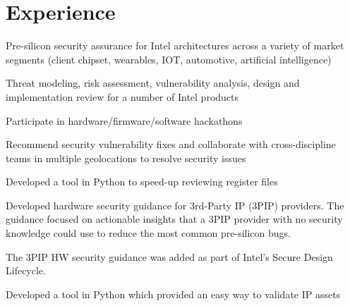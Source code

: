 \documentclass[]{detrano_resume}
\begin{document}
\hfill %
%
%
\begin{minipage}[t]{0.66\textwidth} 
	
	\section{Experience}
	\vspace{\topsep} %
	\begin{tightemize}
		\item Pre-silicon security assurance for Intel architectures across a variety of market segments (client chipset, wearables, IOT, automotive, artificial intelligence)
		\item Threat modeling, risk assessment, vulnerability analysis, design and implementation review for a number of Intel products 
		\item Participate in hardware/firmware/software hackathons 
		\item Recommend security vulnerability fixes and collaborate with cross-discipline teams in multiple geolocations to resolve security issues 
		\item Developed a tool in Python to speed-up reviewing register files 
	\end{tightemize}
	\sectionsep
	
	\begin{tightemize}
		\item Developed hardware security guidance for 3rd-Party IP (3PIP) providers.  The guidance focused on actionable insights that a 3PIP provider with no security knowledge could use to reduce the most common pre-silicon bugs.
		\item The 3PIP HW security guidance was added as part of Intel's Secure Design Lifecycle.
		\item Developed a tool in Python which provided an easy way to validate IP assets
	\end{tightemize}
	\sectionsep
	
	
	
	

\end{minipage}
\end{document}
